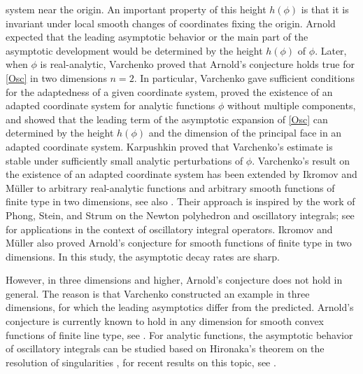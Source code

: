 \documentclass[a4paper, 11pt]{article}
\theoremstyle{plain}
\theoremstyle{definition}
\theoremstyle{lemma}
\theoremstyle{Remark}
\theoremstyle{proposition}
\theoremstyle{corollary}
\theoremstyle{example}
\theoremstyle{assumption}
\begin{document}
system near the origin. An important property of this height $h(\phi)$ is that
it is invariant under local smooth changes of coordinates fixing the origin.
 Arnold expected that the leading asymptotic behavior or the main part of the asymptotic development would be determined by the height  $h(\phi)$ of $\phi$.
    Later, when $\phi$ is real-analytic, Varchenko \cite{Var} proved  that Arnold's conjecture holds true for \eqref{Osc} in two dimensions $n=2.$  In particular, Varchenko gave sufficient conditions for the adaptedness of a given coordinate system, proved the existence of an adapted coordinate system for analytic functions $\phi$ without multiple components, and showed that the leading term of the asymptotic expansion of \eqref{Osc} can determined by the height $h(\phi)$ and  the dimension of the principal face in an adapted coordinate system.     Karpushkin \cite{Kar} proved that
Varchenko's estimate  is stable under sufficiently small analytic perturbations of $\phi.$ %
Varchenko's result on the existence of an adapted coordinate system has been extended by Ikromov and M\"uller \cite{Adap}  to arbitrary real-analytic functions and arbitrary smooth functions of finite type in two dimensions, see also \cite{Greenblatt}.   Their approach is inspired by the work of Phong, Stein,  and Strum \cite{Ph.SS} on the Newton polyhedron and oscillatory integrals; see \cite{Ph.S} for applications in the context of oscillatory integral operators.
Ikromov and   M\"uller  \cite{Ik.Mu} also proved Arnold's conjecture for smooth functions of finite type in two dimensions. In this study, the asymptotic decay rates are sharp.

However, in three dimensions and higher, Arnold's conjecture %
does not hold in general. The reason is that  Varchenko \cite{Var} constructed an example in three dimensions, for which  the leading asymptotics differ from the predicted. Arnold's conjecture is currently known to hold in any dimension for smooth convex functions  of finite line type, see  \cite{Sch, I.U}.
For analytic functions, the asymptotic behavior of oscillatory integrals can be studied  based on Hironaka's theorem on the resolution of singularities \cite{Hironaka, Atiyah}, for recent results on this topic, see \cite{Pramanik}.
\end{document}
